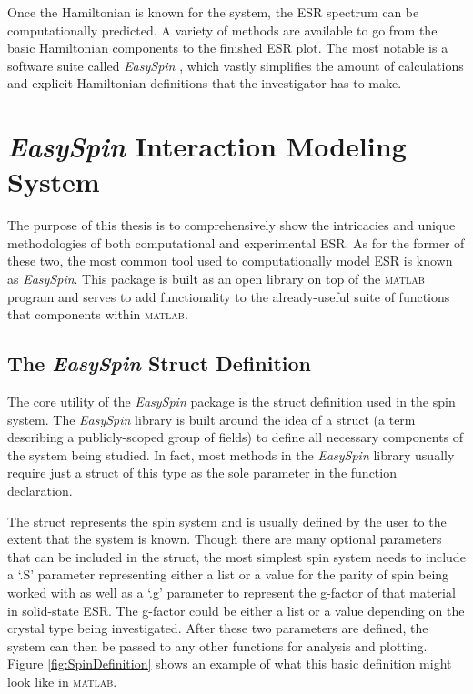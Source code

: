 \documentclass[oneside, astronomy, noacknowlegments]{BYUPhys}
\begin{document}
Once the Hamiltonian is known for the system, the ESR spectrum can be computationally predicted. A variety of methods are available to go from the basic Hamiltonian components to the finished ESR plot. The most notable is a software suite called \textit{EasySpin} \cite{RefWorks:doc:58929a02e4b0d4c09201f91b}, which vastly simplifies the amount of calculations and explicit Hamiltonian definitions that the investigator has to make.

\section{\textit{EasySpin} \cite{RefWorks:doc:58929a02e4b0d4c09201f91b} Interaction Modeling System}

The purpose of this thesis is to comprehensively show the intricacies and unique methodologies of both computational and experimental ESR. As for the former of these two, the most common tool used to computationally model ESR is known as \textit{EasySpin}. This package is built as an open library on top of the \textsc{matlab} program and serves to add functionality to the already-useful suite of functions that components within \textsc{matlab}.

\subsection{The \textit{EasySpin} Struct Definition}

The core utility of the \textit{EasySpin} package is the struct definition used in the spin system. The \textit{EasySpin} library is built around the idea of a struct (a term describing a publicly-scoped group of fields) to define all necessary components of the system being studied. In fact, most methods in the \textit{EasySpin} library usually require just a struct of this type as the sole parameter in the function declaration.

The struct represents the spin system and is usually defined by the user to the extent that the system is known. Though there are many optional parameters that can be included in the struct, the most simplest spin system needs to include a `.S' parameter representing either a list or a value for the parity of spin being worked with as well as a `.g' parameter to represent the g-factor of that material in solid-state ESR. The g-factor could be either a list or a value depending on the crystal type being investigated. After these two parameters are defined, the system can then be passed to any other functions for analysis and plotting. Figure \ref{fig:SpinDefinition} shows an example of what this basic definition might look like in \textsc{matlab}.
\end{document}
